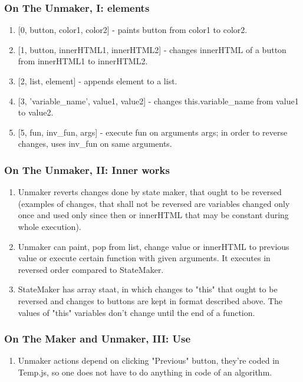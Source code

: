 \documentclass[12pt]{article}
\begin{document}
\subsubsection{On The Unmaker, I: elements}
\begin {enumerate}
	\item {[0, button, color1, color2]} - paints button from color1 to color2.
	\item {[1, button, innerHTML1, innerHTML2]} - changes innerHTML of a button from innerHTML1 to innerHTML2.
	\item {[2, list, element]} - appends element to a list.
	\item {[3, 'variable\_name', value1, value2]} - changes this.variable\_name from value1 to value2.
	\item {[5, fun, inv\_fun, args]} - execute fun on arguments args; in order to reverse changes, uses inv\_fun on same arguments.
\end{enumerate}

\subsubsection{On The Unmaker, II: Inner works}
\begin {enumerate}
	\item Unmaker reverts changes done by state maker, that ought to be reversed (examples of changes, that shall not be reversed are variables changed only once and used only since then or innerHTML that may be constant during whole execution).
	\item Unmaker can paint, pop from list, change value or innerHTML to previous value or execute certain function with given arguments. It executes in reversed order compared to StateMaker.
	\item StateMaker has array staat, in which changes to "this" that ought to be reversed and changes to buttons are kept in format described above. The values of "this" variables don't change until the end of a function.
\end {enumerate}

\subsubsection{On The Maker and Unmaker, III: Use}
\begin {enumerate}
	\item Unmaker actions depend on clicking "Previous" button, they're coded in Temp.js, so one does not have to do anything in code of an algorithm.
\end {enumerate}
\end{document}
